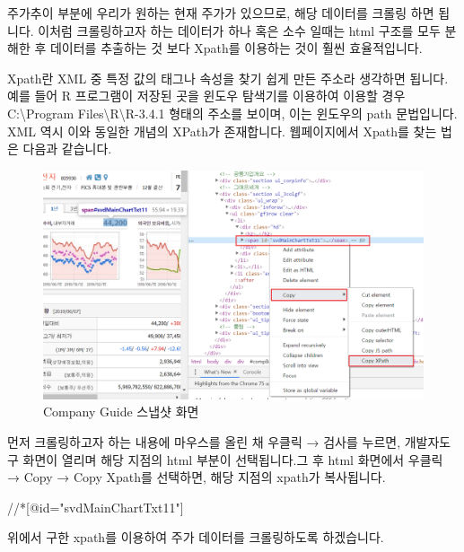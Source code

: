 \documentclass[]{book}
\newenvironment{Shaded}{\begin{snugshade}}{\end{snugshade}}
\newcommand{\NormalTok}[1]{#1}
\begin{document}
주가추이 부분에 우리가 원하는 현재 주가가 있으므로, 해당 데이터를 크롤링 하면 됩니다. 이처럼 크롤링하고자 하는 데이터가 하나 혹은 소수 일때는 html 구조를 모두 분해한 후 데이터를 추출하는 것 보다 Xpath를 이용하는 것이 훨씬 효율적입니다.

Xpath란 XML 중 특정 값의 태그나 속성을 찾기 쉽게 만든 주소라 생각하면 됩니다. 예를 들어 R 프로그램이 저장된 곳을 윈도우 탐색기를 이용하여 이용할 경우 C:\textbackslash{}Program Files\textbackslash{}R\textbackslash{}R-3.4.1 형태의 주소를 보이며, 이는 윈도우의 path 문법입니다. XML 역시 이와 동일한 개념의 XPath가 존재합니다. 웹페이지에서 Xpath를 찾는 법은 다음과 같습니다.

\begin{figure}

{\centering \includegraphics{images/crawl_practice_comp_price2} 

}

\caption{Company Guide 스냅샷 화면}\label{fig:unnamed-chunk-21}
\end{figure}

먼저 크롤링하고자 하는 내용에 마우스를 올린 채 우클릭 → 검사를 누르면, 개발자도구 화면이 열리며 해당 지점의 html 부분이 선택됩니다.그 후 html 화면에서 우클릭 → Copy → Copy Xpath를 선택하면, 해당 지점의 xpath가 복사됩니다.

\begin{Shaded}
\begin{Highlighting}[]
\NormalTok{//*[@id="svdMainChartTxt11"]}
\end{Highlighting}
\end{Shaded}

위에서 구한 xpath를 이용하여 주가 데이터를 크롤링하도록 하겠습니다.
\end{document}

